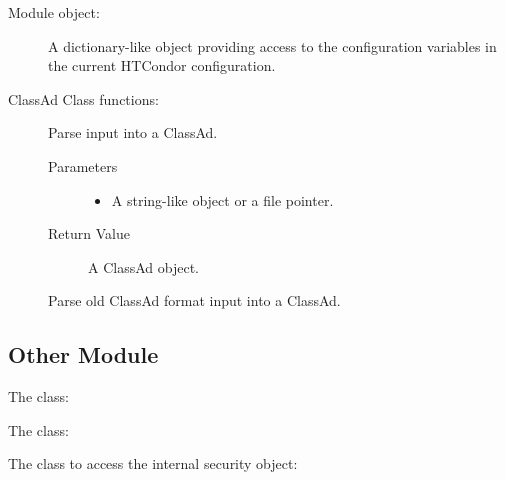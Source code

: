 Module object:
\begin{description}
  \item[]
  A dictionary-like object providing access to the configuration variables
  in the current HTCondor configuration.
\end{description}

ClassAd Class functions:

\begin{description}
\item []
  Parse input into a ClassAd.
  \begin{description}
    \item[ Parameters]
    \begin{itemize}
      \item {} A string-like object or a file pointer. 
    \end{itemize}
    \item[ Return Value]
      A ClassAd object.
  \end{description}  

\item []
  Parse old ClassAd format input into a ClassAd.
\end{description}
 \MoreTodo

\subsection{\label{Python-OtherModule} Other Module}

The  class:
\Todo

The  class:
\Todo

The class to access the internal security object:
\Todo
